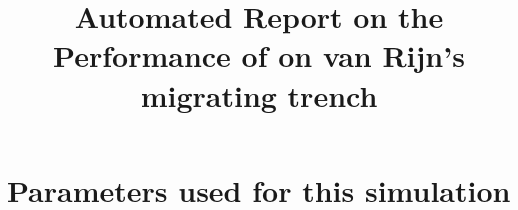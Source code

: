 \documentclass[11pt,a4paper]{article}%
\begin{document}
 

\title{Automated Report on the Performance of \anuga{} on van Rijn's migrating trench}
\maketitle




\section{Parameters used for this simulation}






\end{document}
